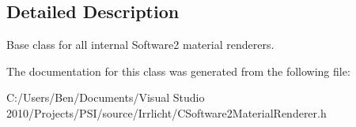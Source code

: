 \subsection{Detailed Description}
Base class for all internal Software2 material renderers. 

The documentation for this class was generated from the following file\-:\begin{DoxyCompactItemize}
\item 
C\-:/\-Users/\-Ben/\-Documents/\-Visual Studio 2010/\-Projects/\-P\-S\-I/source/\-Irrlicht/C\-Software2\-Material\-Renderer.\-h\end{DoxyCompactItemize}
